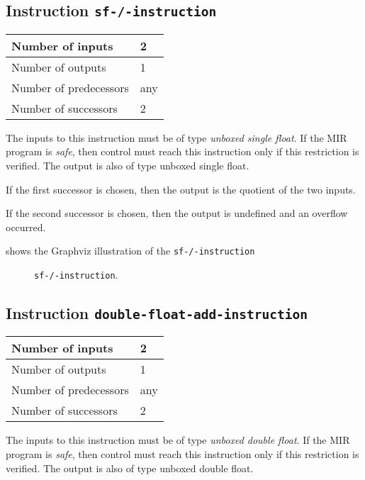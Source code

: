 \subsection{Instruction \texttt{sf-/-instruction}}
\label{mir-instruction-sf-/}

\begin{tabular}{|l|l|}
\hline
Number of inputs & 2\\
\hline
Number of outputs & 1\\
\hline
Number of predecessors & any\\
\hline
Number of successors & 2\\
\hline
\end{tabular}

The inputs to this instruction must be of type \emph{unboxed single
  float}.  If the MIR program is \emph{safe}, then control must reach
this instruction only if this restriction is verified.  The output is
also of type unboxed single float.

If the first successor is chosen, then the output is
the quotient of the two inputs.  

If the second successor is chosen, then the output is undefined and an
overflow occurred. 

 shows the Graphviz illustration of the
\texttt{sf-/-instruction}

\begin{figure}
\begin{center}
\end{center}
\caption{\label{fig-sf-/-instruction}
\texttt{sf-/-instruction}.}
\end{figure}

\subsection{Instruction \texttt{double-float-add-instruction}}
\label{mir-instruction-double-float-add}

\begin{tabular}{|l|l|}
\hline
Number of inputs & 2\\
\hline
Number of outputs & 1\\
\hline
Number of predecessors & any\\
\hline
Number of successors & 2\\
\hline
\end{tabular}

The inputs to this instruction must be of type \emph{unboxed double
  float}.  If the MIR program is \emph{safe}, then control must reach
this instruction only if this restriction is verified.  The output is
also of type unboxed double float.

